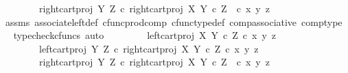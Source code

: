 \begin{isabellebody}
\ \ \ \ \ \ \ \ right{\isacharunderscore}{\kern0pt}cart{\isacharunderscore}{\kern0pt}proj\ Y\ Z\ {\isasymcirc}\isactrlsub c\ right{\isacharunderscore}{\kern0pt}cart{\isacharunderscore}{\kern0pt}proj\ X\ {\isacharparenleft}{\kern0pt}Y\ {\isasymtimes}\isactrlsub c\ Z{\isacharparenright}{\kern0pt}\ \ {\isasymcirc}\isactrlsub c\ {\isasymlangle}x{\isacharcomma}{\kern0pt}\ {\isasymlangle}y{\isacharcomma}{\kern0pt}\ z{\isasymrangle}{\isasymrangle}{\isasymrangle}{\isachardoublequoteclose}\isanewline
\ \ \ \ \isamarkupfalse%
\ assms\ associate{\isacharunderscore}{\kern0pt}left{\isacharunderscore}{\kern0pt}def\ cfunc{\isacharunderscore}{\kern0pt}prod{\isacharunderscore}{\kern0pt}comp\ cfunc{\isacharunderscore}{\kern0pt}type{\isacharunderscore}{\kern0pt}def\ comp{\isacharunderscore}{\kern0pt}associative\ comp{\isacharunderscore}{\kern0pt}type\ \isamarkupfalse%
\ {\isacharparenleft}{\kern0pt}typecheck{\isacharunderscore}{\kern0pt}cfuncs{\isacharcomma}{\kern0pt}\ auto{\isacharparenright}{\kern0pt}\isanewline
\ \ \isamarkupfalse%
\ \isamarkupfalse%
\ {\isachardoublequoteopen}{\isachardot}{\kern0pt}{\isachardot}{\kern0pt}{\isachardot}{\kern0pt}\ {\isacharequal}{\kern0pt}\ {\isasymlangle}\ {\isasymlangle}left{\isacharunderscore}{\kern0pt}cart{\isacharunderscore}{\kern0pt}proj\ X\ {\isacharparenleft}{\kern0pt}Y\ {\isasymtimes}\isactrlsub c\ Z{\isacharparenright}{\kern0pt}\ {\isasymcirc}\isactrlsub c\ {\isasymlangle}x{\isacharcomma}{\kern0pt}\ {\isasymlangle}y{\isacharcomma}{\kern0pt}\ z{\isasymrangle}{\isasymrangle}{\isacharcomma}{\kern0pt}\isanewline
\ \ \ \ \ \ \ \ left{\isacharunderscore}{\kern0pt}cart{\isacharunderscore}{\kern0pt}proj\ Y\ Z\ {\isasymcirc}\isactrlsub c\ right{\isacharunderscore}{\kern0pt}cart{\isacharunderscore}{\kern0pt}proj\ X\ {\isacharparenleft}{\kern0pt}Y\ {\isasymtimes}\isactrlsub c\ Z{\isacharparenright}{\kern0pt}\ {\isasymcirc}\isactrlsub c\ {\isasymlangle}x{\isacharcomma}{\kern0pt}\ {\isasymlangle}y{\isacharcomma}{\kern0pt}\ z{\isasymrangle}{\isasymrangle}{\isasymrangle}{\isacharcomma}{\kern0pt}\isanewline
\ \ \ \ \ \ \ \ right{\isacharunderscore}{\kern0pt}cart{\isacharunderscore}{\kern0pt}proj\ Y\ Z\ {\isasymcirc}\isactrlsub c\ right{\isacharunderscore}{\kern0pt}cart{\isacharunderscore}{\kern0pt}proj\ X\ {\isacharparenleft}{\kern0pt}Y\ {\isasymtimes}\isactrlsub c\ Z{\isacharparenright}{\kern0pt}\ \ {\isasymcirc}\isactrlsub c\ {\isasymlangle}x{\isacharcomma}{\kern0pt}\ {\isasymlangle}y{\isacharcomma}{\kern0pt}\ z{\isasymrangle}{\isasymrangle}{\isasymrangle}{\isachardoublequoteclose}\isanewline

\end{isabellebody}
